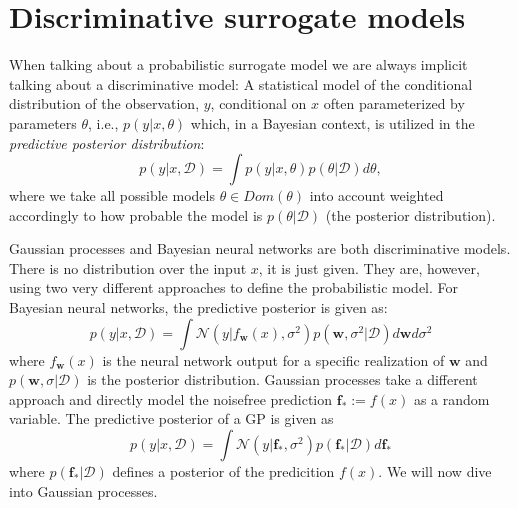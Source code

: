 \chapter{Discriminative surrogate models}

When talking about a probabilistic surrogate model we are always implicit talking about a
discriminative model: A statistical model of the conditional distribution of the observation, $y$, 
conditional on $x$ often parameterized by parameters $\theta$, i.e., $p(y|x, \theta)$ 
which, in a Bayesian context, is utilized in the \textit{predictive posterior
distribution}:
$$p(y|x,\mathcal{D}) = \int p(y|x, \theta)p(\theta|\mathcal{D}) d\theta,$$ where we take all
possible models $\theta \in Dom(\theta)$ into account weighted accordingly to how probable the
model is $p(\theta|\mathcal{D})$ (the posterior distribution). 

Gaussian processes and Bayesian neural networks are both discriminative models. There is no
distribution over the input $x$, it is just given. They are, however, using two very different
approaches to define the probabilistic model. 
For Bayesian neural networks, the predictive posterior is given as:
$$ p(y|x,\mathcal{D}) = \int \mathcal{N}(y|f_{\textbf{w}}(x),
\sigma^2)p(\textbf{w},\sigma^2|\mathcal{D}) d \textbf{w} d\sigma^2$$ where $f_\textbf{w}(x)$ is the
neural network output for a specific realization of $\textbf{w}$ and
$p(\textbf{w},\sigma|\mathcal{D})$ is the posterior distribution. Gaussian processes take a
different approach and directly model the noisefree prediction $\textbf{f}_* := f(x)$ as a random
variable. The predictive posterior of a GP is given as
$$ p(y|x,\mathcal{D}) = \int \mathcal{N}(y|\textbf{f}_*, \sigma^2) p(\textbf{f}_*|\mathcal{D}) d \textbf{f}_*$$
where $p(\textbf{f}_*|\mathcal{D})$ defines a posterior of the
predicition $f(x)$. We will now dive into Gaussian processes.

